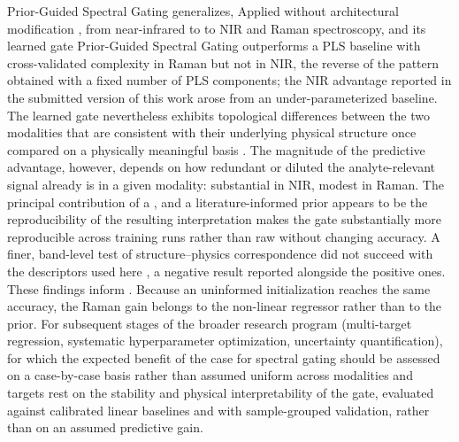 \documentclass[preprint,12pt]{elsarticle}
\providecommand{\DIFaddtex}[1]{{\protect\color{blue} \sf #1}} %
\providecommand{\DIFdeltex}[1]{{\protect\color{red} \scriptsize #1}} %
\providecommand{\DIFaddbegin}{} %
\providecommand{\DIFaddend}{} %
\providecommand{\DIFdelbegin}{} %
\providecommand{\DIFdelend}{} %
\providecommand{\DIFadd}[1]{\texorpdfstring{\DIFaddtex{#1}}{#1}} %
\providecommand{\DIFdel}[1]{\texorpdfstring{\DIFdeltex{#1}}{}} %
\providecommand{\DIFscaledelfig}{0.5}
\newlength{\DIFdelgraphicswidth} %
\newlength{\DIFdelgraphicsheight} %
\providecommand{\DIFaddincludegraphics}[2][]{{\color{blue}\fbox{\DIFOincludegraphics[#1]{#2}}}} %
\providecommand{\DIFdelincludegraphics}[2][]{%
\sbox{\DIFdelgraphicsbox}{\DIFOincludegraphics[#1]{#2}}%
\settoboxwidth{\DIFdelgraphicswidth}{\DIFdelgraphicsbox} %
\settoboxtotalheight{\DIFdelgraphicsheight}{\DIFdelgraphicsbox} %
\scalebox{\DIFscaledelfig}{%
\parbox[b]{\DIFdelgraphicswidth}{\usebox{\DIFdelgraphicsbox}\\[-\baselineskip] \rule{\DIFdelgraphicswidth}{0em}}\llap{\resizebox{\DIFdelgraphicswidth}{\DIFdelgraphicsheight}{%
\setlength{\unitlength}{\DIFdelgraphicswidth}%
\begin{picture}(1,1)%
\thicklines\linethickness{2pt} %
{\color[rgb]{1,0,0}\put(0,0){\framebox(1,1){}}}%
{\color[rgb]{1,0,0}\put(0,0){\line( 1,1){1}}}%
{\color[rgb]{1,0,0}\put(0,1){\line(1,-1){1}}}%
\end{picture}%
}\hspace*{3pt}}} %
} %
\DeclareRobustCommand{\DIFaddbegin}{\DIFOaddbegin \let\includegraphics\DIFaddincludegraphics} %
\DeclareRobustCommand{\DIFaddend}{\DIFOaddend \let\includegraphics\DIFOincludegraphics} %
\DeclareRobustCommand{\DIFdelbegin}{\DIFOdelbegin \let\includegraphics\DIFdelincludegraphics} %
\DeclareRobustCommand{\DIFdelend}{\DIFOaddend \let\includegraphics\DIFOincludegraphics} %
\begin{document}
\DIFdelbegin \DIFdel{Prior-Guided Spectral Gating generalizes, }\DIFdelend \DIFaddbegin \DIFadd{Applied }\DIFaddend without architectural modification \DIFdelbegin \DIFdel{, from near-infrared to }\DIFdelend \DIFaddbegin \DIFadd{to NIR and }\DIFaddend Raman spectroscopy, \DIFdelbegin \DIFdel{and its learned gate }\DIFdelend \DIFaddbegin \DIFadd{Prior-Guided Spectral Gating outperforms a PLS baseline with cross-validated complexity in Raman but not in NIR, the reverse of the pattern obtained with a fixed number of PLS components; the NIR advantage reported in the submitted version of this work arose from an under-parameterized baseline. The learned gate nevertheless }\DIFaddend exhibits topological differences between the two modalities that are consistent with their \DIFdelbegin \DIFdel{underlying }\DIFdelend physical structure once compared on a physically meaningful basis\DIFdelbegin \DIFdel{. The magnitude of the predictive advantage, however, depends on how redundant or diluted the analyte-relevant signal already is in a given modality: substantial in NIR, modest in Raman. The principal contribution of a }\DIFdelend \DIFaddbegin \DIFadd{, and a }\DIFaddend literature-informed prior \DIFdelbegin \DIFdel{appears to be the reproducibility of the resulting interpretation }\DIFdelend \DIFaddbegin \DIFadd{makes the gate substantially more reproducible }\DIFaddend across training runs \DIFdelbegin \DIFdel{rather than raw }\DIFdelend \DIFaddbegin \DIFadd{without changing }\DIFaddend accuracy. A finer, band-level test of structure--physics correspondence did not succeed with the descriptors used here\DIFdelbegin \DIFdel{, a negative result reported alongside the positive ones. These findings inform }\DIFdelend \DIFaddbegin \DIFadd{. Because an uninformed initialization reaches the same accuracy, the Raman gain belongs to the non-linear regressor rather than to the prior. For }\DIFaddend subsequent stages of the \DIFdelbegin \DIFdel{broader }\DIFdelend research program (multi-target regression, \DIFdelbegin \DIFdel{systematic hyperparameter optimization, }\DIFdelend uncertainty quantification), \DIFdelbegin \DIFdel{for which the expected benefit of }\DIFdelend \DIFaddbegin \DIFadd{the case for }\DIFaddend spectral gating should \DIFdelbegin \DIFdel{be assessed on a case-by-case basis rather than assumed uniform across modalities and targets}\DIFdelend \DIFaddbegin \DIFadd{rest on the stability and physical interpretability of the gate, evaluated against calibrated linear baselines and with sample-grouped validation, rather than on an assumed predictive gain}\DIFaddend .
\end{document}
